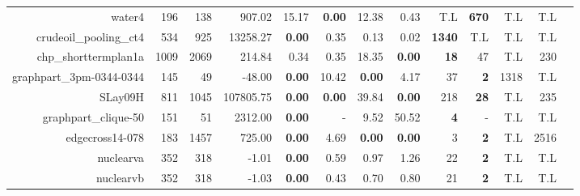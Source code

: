 \begin{landscape}
\begin{table*}[t]
\begin{tabular}{|r|r|r||r||r|r|r|r||r|r|r|r|r|}
                              water4 &           196 &           138 &                            907.02 &          15.17 &  \textbf{0.00} &          12.38 &           0.43 &                T.L &       \textbf{670} &                T.L &                T.L \\ 
              crudeoil\_pooling\_ct4 &           534 &           925 &                          13258.27 &  \textbf{0.00} &           0.35 &           0.13 &           0.02 &      \textbf{1340} &                T.L &                T.L &                T.L \\ 
                chp\_shorttermplan1a &          1009 &          2069 &                            214.84 &           0.34 &           0.35 &          18.35 &  \textbf{0.00} &        \textbf{18} &                 47 &                T.L &                230 \\ 
            graphpart\_3pm-0344-0344 &           145 &            49 &                            -48.00 &  \textbf{0.00} &          10.42 &  \textbf{0.00} &           4.17 &                 37 &         \textbf{2} &               1318 &                T.L \\ 
                             SLay09H &           811 &          1045 &                         107805.75 &  \textbf{0.00} &  \textbf{0.00} &          39.84 &  \textbf{0.00} &                218 &        \textbf{28} &                T.L &                235 \\ 
                graphpart\_clique-50 &           151 &            51 &                           2312.00 &  \textbf{0.00} &              - &           9.52 &          50.52 &         \textbf{4} &                  - &                T.L &                T.L \\ 
                     edgecross14-078 &           183 &          1457 &                            725.00 &  \textbf{0.00} &           4.69 &  \textbf{0.00} &  \textbf{0.00} &                  3 &         \textbf{2} &                T.L &               2516 \\ 
                           nuclearva &           352 &           318 &                             -1.01 &  \textbf{0.00} &           0.59 &           0.97 &           1.26 &                 22 &         \textbf{2} &                T.L &                T.L \\ 
                           nuclearvb &           352 &           318 &                             -1.03 &  \textbf{0.00} &           0.43 &           0.70 &           0.80 &                 21 &         \textbf{2} &                T.L &                T.L \\ 

\end{tabular}
\end{table*}
\end{landscape}
